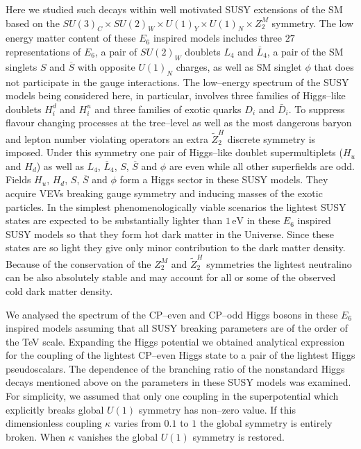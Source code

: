 \documentclass[12pt,a4paper]{article}
\begin{document}
Here we studied such decays within well motivated SUSY extensions of the SM based on the
$SU(3)_C\times SU(2)_W\times U(1)_Y\times U(1)_{N}\times Z_{2}^{M}$ symmetry. The low energy matter
content of these $E_6$ inspired models includes three $27$ representations of $E_6$, a pair of $SU(2)_W$ doublets
$L_4$ and $\overline{L}_4$, a pair of the SM singlets $S$ and $\overline{S}$ with opposite $U(1)_{N}$ charges,
as well as SM singlet $\phi$ that does not participate in the gauge interactions. The low--energy spectrum of the
SUSY models being considered here, in particular, involves three families of Higgs--like doublets $H^{d}_{i}$ and
$H^{u}_{i}$ and three families of exotic quarks $D_i$ and $\bar{D}_i$. To suppress flavour changing processes
at the tree--level as well as the most dangerous baryon and lepton number violating operators an extra
$\tilde{Z}^{H}_2$ discrete symmetry is imposed. Under this symmetry one pair of Higgs--like doublet
supermultiplets ($H_u$ and $H_d$) as well as $L_4$, $\overline{L}_4$, $S$, $\overline{S}$ and $\phi$ are even
while all other superfields are odd. Fields $H_u$, $H_d$, $S$, $\overline{S}$ and $\phi$ form a Higgs sector
in these SUSY models. They acquire VEVs breaking gauge symmetry and inducing masses of the exotic particles.
In the simplest phenomenologically viable scenarios the lightest SUSY states are expected to be substantially lighter
than $1\,\mbox{eV}$ in these $E_6$ inspired SUSY models so that they form hot dark matter in the Universe.
Since these states are so light they give only minor contribution to the dark matter density. Because of the conservation
of the $Z^{M}_2$ and $\tilde{Z}^{H}_2$ symmetries the lightest neutralino can be also absolutely stable and
may account for all or some of the observed cold dark matter density.

We analysed the spectrum of the CP--even and CP--odd Higgs bosons in these $E_6$ inspired models
assuming that all SUSY breaking parameters are of the order of the TeV scale. Expanding the Higgs potential
we obtained analytical expression for the coupling of the lightest CP--even Higgs state to a pair of the lightest
Higgs pseudoscalars. The dependence of the branching ratio of the nonstandard Higgs decays mentioned above
on the parameters in these SUSY models was examined. For simplicity, we assumed that only one coupling
in the superpotential which explicitly breaks global $U(1)$ symmetry has non--zero value. If this dimensionless
coupling $\kappa$ varies from $0.1$ to $1$ the global symmetry is entirely broken. When $\kappa$ vanishes
the global $U(1)$ symmetry is restored.
\end{document}
